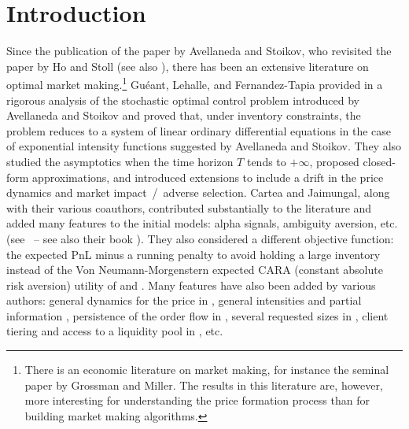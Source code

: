 \documentclass[preprint, 3p]{elsarticle}
\newcommand{\1}{{\chi}}
\begin{document}
\section{Introduction}

Since the publication of the paper \cite{avellaneda2008high} by Avellaneda and Stoikov, who revisited the paper \cite{ho1981optimal} by Ho and Stoll (see also \cite{ho1983dynamics}), there has been an extensive literature on optimal market making.\footnote{There is an economic literature on market making, for instance the seminal paper \cite{grossman1988liquidity} by Grossman and Miller. The results in this literature are, however, more interesting for understanding the price formation process than for building market making algorithms.} Guéant, Lehalle, and Fernandez-Tapia provided in \cite{gueant2013dealing} a rigorous analysis of the stochastic optimal control problem introduced by Avellaneda and Stoikov and proved that, under inventory constraints, the problem reduces to a system of linear ordinary differential equations in the case of exponential intensity functions suggested by Avellaneda and Stoikov. They also studied the asymptotics when the time horizon $T$ tends to $+\infty$, proposed closed-form approximations, and introduced extensions to include a drift in the price dynamics and market impact~/~adverse selection. Cartea and Jaimungal, along with their various coauthors, contributed substantially to the literature and added many features to the initial models:  alpha signals, ambiguity aversion, etc. (see~\cite{cartea2017algorithmic,cartea2014buy, cartea2018algorithmic} -- see also their book \cite{cartea2015algorithmic}). They also considered a different objective function: the expected PnL minus a running penalty to avoid holding a large inventory instead of the Von Neumann-Morgenstern expected CARA (constant absolute risk aversion) utility of \cite{avellaneda2008high} and \cite{gueant2013dealing}. Many features have also been added by various authors: general dynamics for the price in \cite{fodra2012high}, general intensities and partial information \cite{campi2020optimal}, persistence of the order flow in \cite{jusselin2020optimal}, several requested sizes in \cite{bergault2019size}, client tiering and access to a liquidity pool in \cite{barzykin2020algorithmic}, etc.\\
\end{document}
